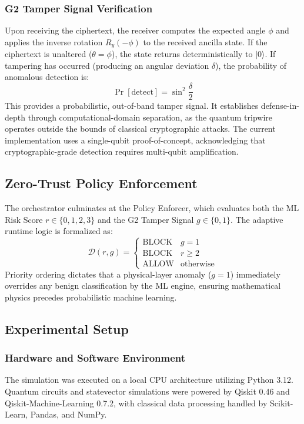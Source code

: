 \subsubsection{G2 Tamper Signal Verification}
Upon receiving the ciphertext, the receiver computes the expected angle $\phi$ and applies the inverse rotation $R_y(-\phi)$ to the received ancilla state. If the ciphertext is unaltered ($\theta = \phi$), the state returns deterministically to $|0\rangle$. If tampering has occurred (producing an angular deviation $\delta$), the probability of anomalous detection is:
\begin{equation}
\Pr[\mathrm{detect}] = \sin^2\frac{\delta}{2}
\end{equation}
This provides a probabilistic, out-of-band tamper signal. It establishes defense-in-depth through computational-domain separation, as the quantum tripwire operates outside the bounds of classical cryptographic attacks. The current implementation uses a single-qubit proof-of-concept, acknowledging that cryptographic-grade detection requires multi-qubit amplification.

\subsection{Zero-Trust Policy Enforcement}
The orchestrator culminates at the Policy Enforcer, which evaluates both the ML Risk Score $r \in \{0,1,2,3\}$ and the G2 Tamper Signal $g \in \{0, 1\}$. The adaptive runtime logic is formalized as:
\begin{equation}
\mathcal{D}(r, g) = \begin{cases} \text{BLOCK} & g = 1 \\ \text{BLOCK} & r \ge 2 \\ \text{ALLOW} & \text{otherwise} \end{cases}
\end{equation}
Priority ordering dictates that a physical-layer anomaly ($g=1$) immediately overrides any benign classification by the ML engine, ensuring mathematical physics precedes probabilistic machine learning.

\subsection{Experimental Setup}

\subsubsection{Hardware and Software Environment}
The simulation was executed on a local CPU architecture utilizing Python 3.12. Quantum circuits and statevector simulations were powered by Qiskit 0.46 and Qiskit-Machine-Learning 0.7.2, with classical data processing handled by Scikit-Learn, Pandas, and NumPy.

